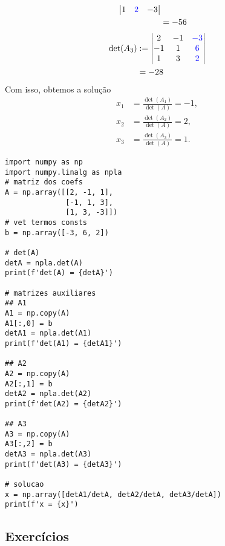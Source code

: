 \begin{ex}
\begin{subequations}
\begin{align}
\begin{vmatrix}
                  1 & {\color{blue}2} & -3
                \end{vmatrix}\\
              &= -56
    \end{align}
  \end{subequations}
  \begin{subequations}
    \begin{align}
      \det(A_3) &:=
                \begin{vmatrix}
                  2 & -1 & {\color{blue}-3}\\
                  -1 & 1 & {\color{blue}6}\\
                  1 & 3 & {\color{blue}2}
                \end{vmatrix}\\
              &= -28
    \end{align}
  \end{subequations}
  Com isso, obtemos a solução
  \begin{subequations}
    \begin{align}
      x_1 &= \frac{\det(A_1)}{\det(A)} = -1,\\
      x_2 &= \frac{\det(A_2)}{\det(A)} = 2,\\
      x_3 &= \frac{\det(A_3)}{\det(A)} = 1.
    \end{align}
  \end{subequations}

\begin{lstlisting}
import numpy as np
import numpy.linalg as npla
# matriz dos coefs
A = np.array([[2, -1, 1],
              [-1, 1, 3],
              [1, 3, -3]])
# vet termos consts
b = np.array([-3, 6, 2])

# det(A)
detA = npla.det(A)
print(f'det(A) = {detA}')

# matrizes auxiliares
## A1
A1 = np.copy(A)
A1[:,0] = b
detA1 = npla.det(A1)
print(f'det(A1) = {detA1}')

## A2
A2 = np.copy(A)
A2[:,1] = b
detA2 = npla.det(A2)
print(f'det(A2) = {detA2}')

## A3
A3 = np.copy(A)
A3[:,2] = b
detA3 = npla.det(A3)
print(f'det(A3) = {detA3}')

# solucao
x = np.array([detA1/detA, detA2/detA, detA3/detA])
print(f'x = {x}')
\end{lstlisting}
\end{ex}


\subsection{Exercícios}

